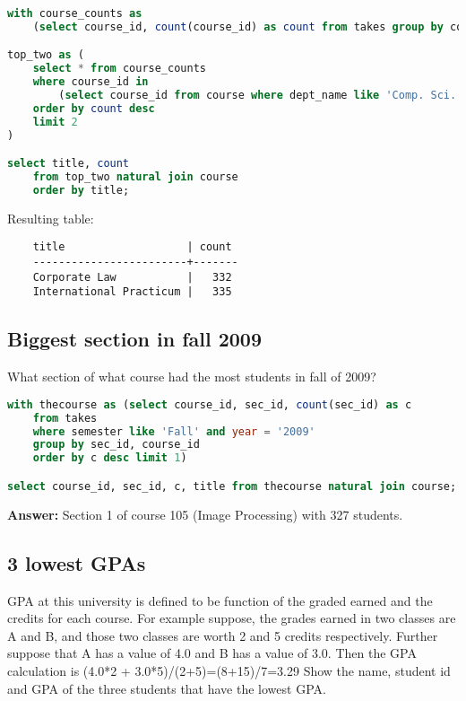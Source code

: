 \documentclass[11pt, oneside]{amsart}   	%
\begin{document}
\begin{lstlisting}[language=SQL]
with course_counts as 
    (select course_id, count(course_id) as count from takes group by course_id),

top_two as (
    select * from course_counts 
    where course_id in 
        (select course_id from course where dept_name like 'Comp. Sci.')
    order by count desc
    limit 2
)

select title, count
    from top_two natural join course 
    order by title;
\end{lstlisting}

Resulting table: 

\begin{verbatim}
    title                   | count
    ------------------------+-------
    Corporate Law           |   332
    International Practicum |   335
\end{verbatim}

\subsection{Biggest section in fall 2009}

 What section of what course had the most students in fall of 2009?

\begin{lstlisting}[language=SQL]
with thecourse as (select course_id, sec_id, count(sec_id) as c 
    from takes 
    where semester like 'Fall' and year = '2009'
    group by sec_id, course_id
    order by c desc limit 1)

select course_id, sec_id, c, title from thecourse natural join course;
\end{lstlisting}
\textbf{Answer: } Section 1 of course 105 (Image Processing) with 327 students. 

\subsection{3 lowest GPAs}

GPA at this university is defined to be function of the graded earned and the credits for each course. For example suppose, the grades earned in two classes are A and B, and those two classes are worth 2 and 5 credits respectively. Further suppose that A has a value of 4.0 and B has a value of 3.0. Then the GPA calculation is (4.0*2 + 3.0*5)/(2+5)=(8+15)/7=3.29 Show the name, student id and GPA of the three students that have the lowest GPA. 
\end{document}

